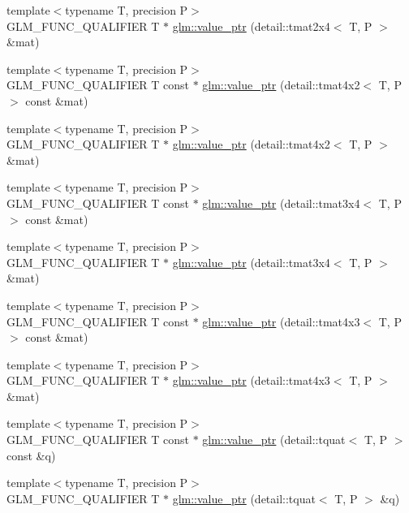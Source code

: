 \begin{CompactItemize}
\item 
{\footnotesize template$<$typename T, precision P$>$ }\\GLM\_\-FUNC\_\-QUALIFIER T $\ast$ \hyperlink{group__gtc__type__ptr_g998aae25d0d9de346b951148c61e930e}{glm::value\_\-ptr} (detail::tmat2x4$<$ T, P $>$ \&mat)
\item 
{\footnotesize template$<$typename T, precision P$>$ }\\GLM\_\-FUNC\_\-QUALIFIER T const $\ast$ \hyperlink{group__gtc__type__ptr_g548aa4697fc58fdd3d33df6c57777191}{glm::value\_\-ptr} (detail::tmat4x2$<$ T, P $>$ const \&mat)
\item 
{\footnotesize template$<$typename T, precision P$>$ }\\GLM\_\-FUNC\_\-QUALIFIER T $\ast$ \hyperlink{group__gtc__type__ptr_gcf65ffcdfc741ebebedfc7a50e2bde7f}{glm::value\_\-ptr} (detail::tmat4x2$<$ T, P $>$ \&mat)
\item 
{\footnotesize template$<$typename T, precision P$>$ }\\GLM\_\-FUNC\_\-QUALIFIER T const $\ast$ \hyperlink{group__gtc__type__ptr_g7ac16d67cf7bb44cb53bc7e6a7c8bd2c}{glm::value\_\-ptr} (detail::tmat3x4$<$ T, P $>$ const \&mat)
\item 
{\footnotesize template$<$typename T, precision P$>$ }\\GLM\_\-FUNC\_\-QUALIFIER T $\ast$ \hyperlink{group__gtc__type__ptr_gf7f8f1087650774da27f31c99175cfeb}{glm::value\_\-ptr} (detail::tmat3x4$<$ T, P $>$ \&mat)
\item 
{\footnotesize template$<$typename T, precision P$>$ }\\GLM\_\-FUNC\_\-QUALIFIER T const $\ast$ \hyperlink{group__gtc__type__ptr_g7c8877c9dc37f2229d4b75fd735be5d5}{glm::value\_\-ptr} (detail::tmat4x3$<$ T, P $>$ const \&mat)
\item 
{\footnotesize template$<$typename T, precision P$>$ }\\GLM\_\-FUNC\_\-QUALIFIER T $\ast$ \hyperlink{group__gtc__type__ptr_g1ba54cb6c4ff3c61c27f4883bddf6d31}{glm::value\_\-ptr} (detail::tmat4x3$<$ T, P $>$ \&mat)
\item 
{\footnotesize template$<$typename T, precision P$>$ }\\GLM\_\-FUNC\_\-QUALIFIER T const $\ast$ \hyperlink{group__gtc__type__ptr_g06ca6cd0663b5a1ed1c217efc80013d8}{glm::value\_\-ptr} (detail::tquat$<$ T, P $>$ const \&q)
\item 
{\footnotesize template$<$typename T, precision P$>$ }\\GLM\_\-FUNC\_\-QUALIFIER T $\ast$ \hyperlink{group__gtc__type__ptr_ga84b8d637d0b816514e2db6ce19cec6c}{glm::value\_\-ptr} (detail::tquat$<$ T, P $>$ \&q)
\end{CompactItemize}


